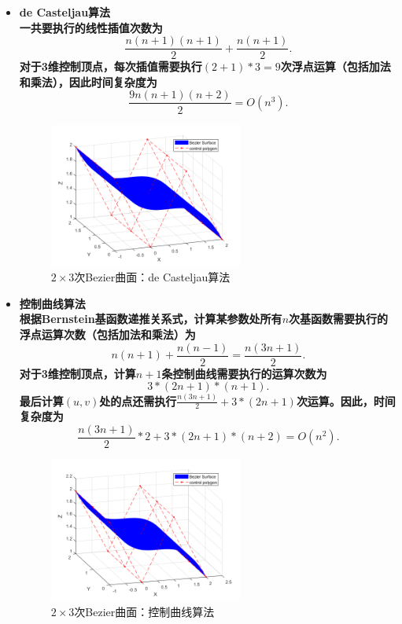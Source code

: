 \documentclass[utf8]{ctexart}
\begin{document}
\begin{itemize}
    \item \bf{de Casteljau算法}\\
    一共要执行的线性插值次数为
    $$
    \frac{n(n+1)(n+1)}{2} + \frac{n(n+1)}{2}.
    $$
    对于3维控制顶点，每次插值需要执行$(2+1)*3=9$次浮点运算（包括加法和乘法），因此时间复杂度为
    $$
    \frac{9n(n+1)(n+2)}{2} = O(n^3).
    $$
    \begin{figure}[H]
        \centering
        \includegraphics[width=0.6\textwidth]{bezierSurf_deCas.png}
        \caption{$2\times 3$次Bezier曲面：de Casteljau算法}
        \label{fig: bezierSurf_deCas}
    \end{figure}
    \item \bf{控制曲线算法}\\
    根据Bernstein基函数递推关系式，计算某参数处所有$n$次基函数需要执行的浮点运算次数（包括加法和乘法）为
    $$
    n(n + 1) + \frac{n(n-1)}{2} = \frac{n(3n+1)}{2}.
    $$
    对于3维控制顶点，计算$n+1$条控制曲线需要执行的运算次数为
    $$
    3 * (2n+1) * (n+1).
    $$
    最后计算$(u,v)$处的点还需执行$\frac{n(3n+1)}{2} + 3 * (2n+1)$次运算。因此，时间复杂度为
    $$
    \frac{n(3n+1)}{2} * 2 + 3 * (2n+1) * (n+2) = O(n^2).
    $$
    \begin{figure}[H]
        \centering
        \includegraphics[width=0.6\textwidth]{bezierSurf_bern.png}
        \caption{$2\times 3$次Bezier曲面：控制曲线算法}
        \label{fig: bezierSurf_bern}
    \end{figure}
\end{itemize}
\end{document}
